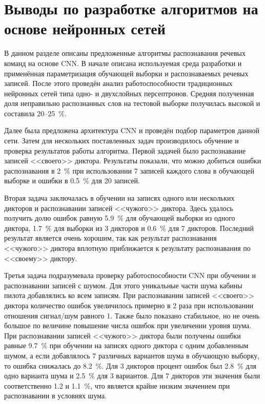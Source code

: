 \section{Выводы по разработке алгоритмов на основе нейронных сетей} \label{sect4_7}

В данном разделе описаны предложенные алгоритмы распознавания речевых команд на основе CNN.
В начале описана используемая среда разработки и применённая параметризация обучающей выборки и распознаваемых речевых записей.
После этого проведён анализ работоспособности традиционных нейронных сетей типа одно- и двухслойных персептронов.
Средняя полученная доля неправильно распознанных слов на тестовой выборке получилась высокой и составила 20--25~\%.

Далее была предложена архитектура CNN и проведён подбор параметров данной сети.
Затем для нескольких поставленных задач производилось обучение и проверка результатов работы алгоритма.
Первой задачей было распознавание записей <<своего>> диктора.
Результаты показали, что можно добиться ошибки распознавания в 2~\% при использовании 7 записей каждого слова в обучающей выборке и ошибки в 0.5~\% для 20 записей.

Вторая задача заключалась в обучении на записях одного или нескольких дикторов и распознавании записей <<чужого>> диктора.
Здесь удалось получить долю ошибок равную 5.9~\% для обучающей выборки из одного диктора, 1.7~\% для выборки из 3 дикторов и 0.6~\% для 7 дикторов.
Последний результат является очень хорошим, так как результат распознавания <<чужого>> диктора вплотную приближается к результату распознавания по <<своему>> диктору.

Третья задача подразумевала проверку работоспособности CNN при обучении и распознавании записей с шумом.
Для этого уникальные части шума кабины пилота добавлялись ко всем записям.
При распознавании записей <<своего>> диктора количество ошибок увеличилось примерно в 2 раза при использовании отношения сигнал/шум равного 1.
Также было показано стабильное, но не очень большое по величине повышение числа ошибок при увеличении уровня шума.
При распознавании записей <<чужого>> диктора были получены ошибки равные 9.7~\% при обучении на записях одного диктора с одним добавленным шумом, а если добавлялось 7 различных вариантов шума в обучающую выборку, то ошибка снижалась до 8.2~\%.
Для 3 дикторов процент ошибок был 2.8~\% для одно варианта шума и 2.5~\% для 3 вариантов.
Для 7 дикторов эти значения были соответственно 1.2 и 1.1~\%, что является крайне низким значением при распознавании в условиях шума.


